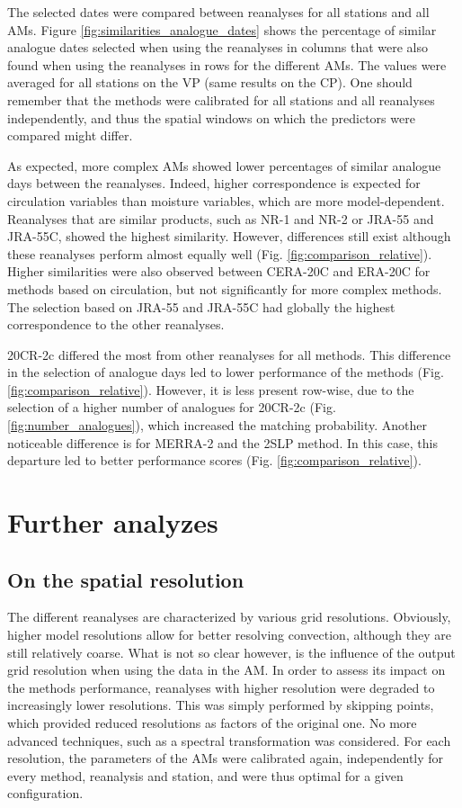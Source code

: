 \documentclass{ametsoc}
\begin{document}
The selected dates were compared between reanalyses for all stations and all AMs. Figure \ref{fig:similarities_analogue_dates} shows the percentage of similar analogue dates selected when using the reanalyses in columns that were also found when using the reanalyses in rows for the different AMs. The values were averaged for all stations on the VP (same results on the CP). One should remember that the methods were calibrated for all stations and all reanalyses independently, and thus the spatial windows on which the predictors were compared might differ.

As expected, more complex AMs showed lower percentages of similar analogue days between the reanalyses. Indeed, higher correspondence is expected for circulation variables than moisture variables, which are more model-dependent. Reanalyses that are similar products, such as NR-1 and NR-2 or JRA-55 and JRA-55C, showed the highest similarity. However, differences still exist although these reanalyses perform almost equally well (Fig. \ref{fig:comparison_relative}). Higher similarities were also observed between CERA-20C and ERA-20C for methods based on circulation, but not significantly for more complex methods. The selection based on JRA-55 and JRA-55C had globally the highest correspondence to the other reanalyses.

20CR-2c differed the most from other reanalyses for all methods. This difference in the selection of analogue days led to lower performance of the methods (Fig. \ref{fig:comparison_relative}). However, it is less present row-wise, due to the selection of a higher number of analogues for 20CR-2c (Fig. \ref{fig:number_analogues}), which increased the matching probability. Another noticeable difference is for MERRA-2 and the 2SLP method. In this case, this departure led to better performance scores (Fig. \ref{fig:comparison_relative}).


\section{Further analyzes}
\label{sec:analyzes}

\subsection{On the spatial resolution}
\label{sec:resolution}

The different reanalyses are characterized by various grid resolutions. Obviously, higher model resolutions allow for better resolving convection, although they are still relatively coarse. What is not so clear however, is the influence of the output grid resolution when using the data in the AM. In order to assess its impact on the methods performance, reanalyses with higher resolution were degraded to increasingly lower resolutions. This was simply performed by skipping points, which provided reduced resolutions as factors of the original one. No more advanced techniques, such as a spectral transformation was considered. For each resolution, the parameters of the AMs were calibrated again, independently for every method, reanalysis and station, and were thus optimal for a given configuration. 
\end{document}

